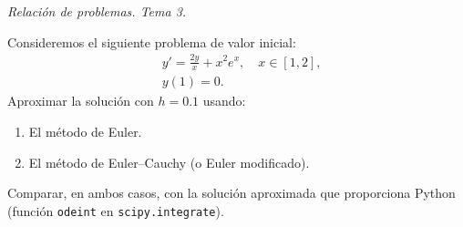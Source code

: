 \documentclass[11pt]{article}
\begin{document}
\begin{flushright}
  \LARGE\it Relación de problemas. Tema \huge 3.\\
  \bigskip
\end{flushright}

\begin{problemas}

  \begin{problema}
    Consideremos el siguiente problema de valor inicial:
    \begin{align*}
      &y'=\frac{2y}{x} + x^2e^x, \quad x\in[1,2],\\
      &y(1)=0.
    \end{align*}
    Aproximar la solución con $h=0.1$ usando:
    \begin{enumerate}
    \item El método de Euler.
    \item El método de Euler--Cauchy (o Euler modificado).
    \end{enumerate}
    Comparar, en ambos casos, con la solución aproximada que
    proporciona Python (función \texttt{odeint} en
    \texttt{scipy.integrate}).
  \end{problema}
  

  \begin{problema}
    
  \end{problema}
  
  \end{problemas}
\end{document}
